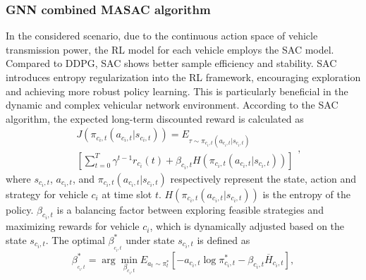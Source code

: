 \documentclass[lettersize,journal,onecolumn]{IEEEtran}
\begin{document}
\subsubsection{GNN combined  MASAC algorithm}
In the considered scenario, due to the continuous action space of vehicle transmission power, the RL model for each vehicle employs the SAC model. Compared to DDPG, SAC shows better sample efficiency and stability. SAC introduces entropy regularization into the RL framework, encouraging exploration and achieving more robust policy learning. This is particularly beneficial in the dynamic and complex vehicular network environment. According to the SAC algorithm, the expected long-term discounted reward is calculated as
\begin{equation}
\begin{aligned}
&J\left( {{\pi }_{{{c}_{i}},t}}\left( {{a}_{{{c}_{i}},t}}|{{s}_{{{c}_{i}},t}} \right) \right)={{E}_{\tau \sim{{\pi }_{{{c}_{i}},t}}\left( {{a}_{{{c}_{i}},t}}|{{s}_{{{c}_{i}},t}} \right)}} \\
&\left[ \sum\limits_{t=0}^{T}{{{\gamma }^{t-1}}}{{r}_{{{c}_{i}}}}(t)+{{\beta }_{{{c}_{i}},t}}H\left( {{\pi }_{{{c}_{i}},t}}\left( {{a}_{{{c}_{i}},t}}|{{s}_{{{c}_{i}},t}} \right) \right) \right]
\end{aligned}
\label{eq26},
\end{equation}
where ${{s}_{{{c}_{i}},t}}$, ${{a}_{{{c}_{i}},t}}$, and ${{\pi }_{{{c}_{i}},t}}\left( {{a}_{{{c}_{i}},t}}|{{s}_{{{c}_{i}},t}} \right)$ respectively represent the state, action and strategy for vehicle ${{c}_{i}}$ at time slot $t$. $H\left( {{\pi }_{{{c}_{i}},t}}\left( {{a}_{{{c}_{i}},t}}|{{s}_{{{c}_{i}},t}} \right) \right)$ is the entropy of the policy. ${{\beta }_{{{c}_{i}},t}}$ is a balancing factor between exploring feasible strategies and maximizing rewards for vehicle ${{c}_{i}}$, which is dynamically adjusted based on the state ${{s}_{{{c}_{i}},t}}$. The optimal $\beta _{_{{{c}_{i}},t}}^{*}$ under state ${{s}_{{{c}_{i}},t}}$ is defined as
\begin{equation}
\beta _{_{{{c}_{i}},t}}^{*}=\arg {{\min }_{{{\beta }_{{{c}_{i}},t}}}}{{E}_{{{a}_{t}}\sim\pi _{t}^{*}}}\left[ -{{a}_{{{c}_{i}},t}}\log \pi _{{{c}_{i}},t}^{*}-{{\beta }_{{{c}_{i}},t}}{{\overline{H}}_{{{c}_{i}},t}} \right]
\label{eq27},
\end{equation}
\end{document}
